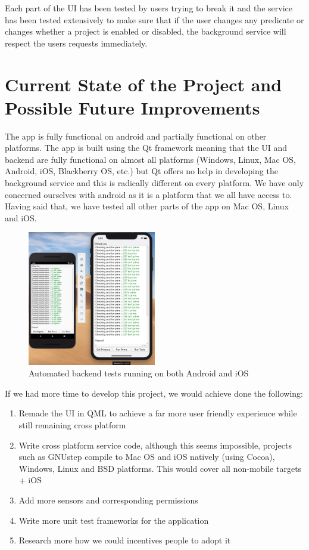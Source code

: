 \documentclass{article}
\begin{document}
Each part of the UI has been tested by users trying to break it and the service has been tested extensively to make sure that if the user
changes any predicate or changes whether a project is enabled or disabled, the background service will respect the users requests immediately.

\section{Current State of the Project and Possible Future Improvements}
The app is fully functional on android and partially functional on other platforms. The app is built using the Qt framework meaning that
the UI and backend are fully functional on almost all platforms (Windows, Linux, Mac OS, Android, iOS, Blackberry OS, etc.) but
Qt offers no help in developing the background service and this is radically different on every platform. We have only concerned ourselves
with android as it is a platform that we all have access to. Having said that, we have tested all other parts of the app on
Mac OS, Linux and iOS.
\begin{figure}[h]
  \centering
  \includegraphics[width=0.5\textwidth]{DocFiles/tests}
  \caption{Automated backend tests running on both Android and iOS}
\end{figure}
If we had more time to develop this project, we would achieve done the following:
\begin{enumerate}
  \item{Remade the UI in QML to achieve a far more user friendly experience while still remaining cross platform}
  \item{Write cross platform service code, although this seems impossible, projects such as GNUstep compile to Mac OS and iOS natively (using Cocoa),
    Windows, Linux and BSD platforms. This would cover all non-mobile targets + iOS}
  \item{Add more sensors and corresponding permissions}
  \item{Write more unit test frameworks for the application}
  \item{Research more how we could incentives people to adopt it}
\end{enumerate}
\end{document}
